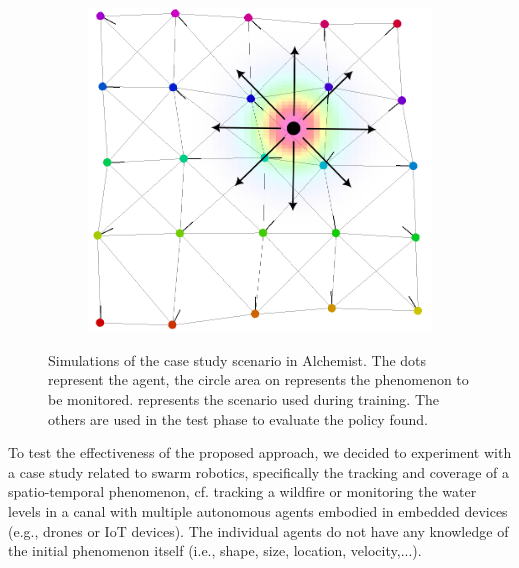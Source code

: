 \documentclass[conference]{IEEEtran}
\begin{document}
\begin{figure}
\begin{subfigure}[b]{0.32\linewidth}
      \caption{}
      \label{fig:two}
  \end{subfigure}
  \begin{subfigure}[b]{0.32\linewidth}
      \includegraphics[width=\textwidth]{imgs/example-moving.png}
      \caption{}
      \label{fig:moving}
  \end{subfigure}

 
  \caption{Simulations of the case study scenario in Alchemist. 
  The dots represent the agent, 
  the circle area on represents the phenomenon to be monitored.
   represents the scenario used during training. 
  The others are used in the test phase to evaluate the policy found. }
  \label{fig:scenarios}
\end{figure}
To test the effectiveness of the proposed approach, 
 we decided to experiment with a case study related to swarm robotics, 
 specifically the tracking and coverage of a spatio-temporal phenomenon, cf. tracking a wildfire 
 or monitoring the water levels in a canal with multiple autonomous agents embodied in embedded devices (e.g., drones or IoT devices). The individual agents do not have any knowledge of the initial phenomenon itself (i.e., shape, size, location, velocity,...).
\end{document}

